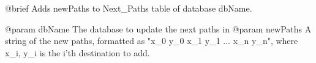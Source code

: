 \begin{DoxyVerb}    @brief   Adds newPaths to Next_Paths table of database dbName.

    @param dbName   The database to update the next paths in
    @param newPaths A string of the new paths, formatted as "x_0 y_0
                    x_1 y_1 ... x_n y_n", where x_i, y_i is the i'th
                    destination to add.
\end{DoxyVerb}
 